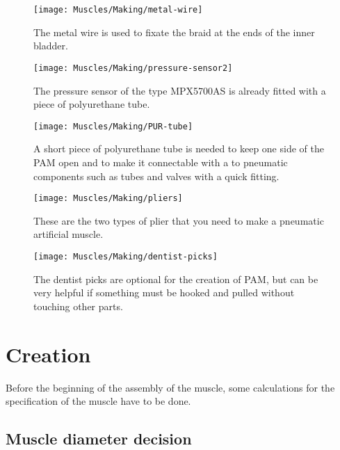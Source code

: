 \documentclass[main]{subfiles}
\begin{document}
\begin{figure}[H]
\centering
\texttt{[image: Muscles/Making/metal-wire]}
\caption[Metal wire]{The metal wire is used to fixate the braid at the ends of the inner bladder.}
\label{metal-wire}
\end{figure}

\begin{figure}[H]
\centering
\texttt{[image: Muscles/Making/pressure-sensor2]}
\caption[The pressure sensor MPX5700AS with PUR tube]{The pressure sensor of the type MPX5700AS is already fitted with a piece of polyurethane tube.}
\label{pressure-sensor}
\end{figure}

\begin{figure}[H]
\centering
\texttt{[image: Muscles/Making/PUR-tube]}
\caption[Piece of PUR tube]{A short piece of polyurethane tube is needed to keep one side of the PAM open and to make it connectable with a to pneumatic components such as tubes and valves with a quick fitting.}
\label{PUR-tube}
\end{figure}

\begin{figure}[H]
\centering
\texttt{[image: Muscles/Making/pliers]}
\caption[Necessary pliers for PAM making]{These are the two types of plier that you need to make a pneumatic artificial muscle.}
\label{pliers}
\end{figure}

\begin{figure}[H]
\centering
\texttt{[image: Muscles/Making/dentist-picks]}
\caption[Dentist picks]{The dentist picks are optional for the creation of PAM, but can be very helpful if something must be hooked and pulled without touching other parts.}
\label{dentist-picks}
\end{figure}

\section{Creation}

Before the beginning of the assembly of the muscle, some calculations for the specification of the muscle have to be done. 


\subsection{Muscle diameter decision}
\end{document}
